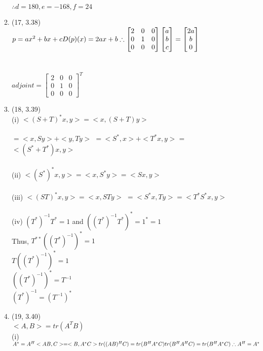 \documentclass[letterpaper,12pt]{article}
\theoremstyle{definition}
\begin{document}
\begin{enumerate}
$\therefore d=180, e=-168, f=24$


		 
	\item (17, 3.38) \\ $p = ax^2 + bx + c \\ D(p)(x)=2ax+b\\ \therefore \begin{bmatrix}
			2&0&0\\0&1&0\\0&0&0\end{bmatrix} \begin{bmatrix}
			a\\b\\c\end{bmatrix} = \begin{bmatrix}2a\\b\\0\end{bmatrix}$  \\ \\ \\
			$adjoint = \begin{bmatrix}
			2&0&0\\0&1&0\\0&0&0\end{bmatrix}^T$


	\item (18, 3.39) \\
(i) $<(S+T)^*x, y> = <x, (S+T)y>$
\\
\\
$=<x,Sy> + <y,Ty>$
$=<S^*,x> + <T^*x,y>$ = $<(S^*+T^*)x,y>$
\\
\\
(ii)
$<(S^*)^*x, y> = <x,S^*y> = <Sx,y>$
\\
\\
(iii)
$<(ST)^*x,y> = <x,STy>$
$=<S^*x, Ty> = <T^*S^*x, y>$
\\
\\
(iv)
$(T^*)^{-1}T^*=1$ and $((T^*)^{-1}T^*)^*=1^*=1$
\\
Thus, $T^{**}((T^*)^{-1})^*=1$
\\
$T((T^*)^{-1})^*=1$
\\
$((T^*)^{-1})^*=T^{-1}$
\\
$(T^*)^{-1}=(T^{-1})^*$



	\item (19, 3.40)  \\$<A,B> = tr(A^TB)$ \\
				(i) $A^* = A^H \\ <AB,C> = <B,A^*C> \\ tr((AB)^HC)=tr(B^HA^*C) \\ tr(B^HA^HC) = tr(B^HA^*C) \\ \therefore A^H = A^*  $\\


\end{enumerate}
\end{document}
